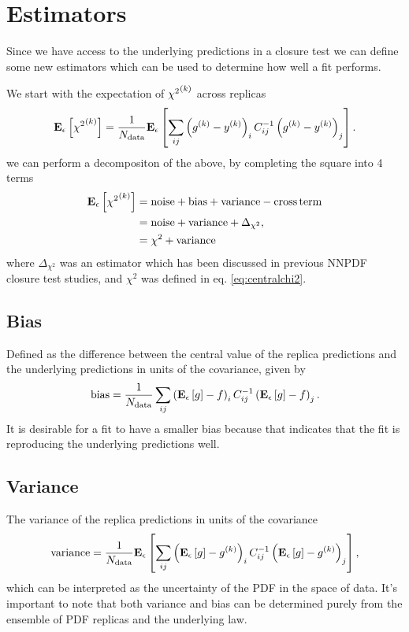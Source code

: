 \section{Estimators}
Since we have access to the underlying predictions in a closure test we can
define some new estimators which can be used to determine how well a fit performs.

We start with the expectation of ${\chi^2}^{(k)}$ across replicas
\begin{equation}
    \mathbf{E}_{\epsilon}\left[ {\chi^2}^{(k)} \right] = \frac{1}{N_{\rm data}}\mathbf{E}_{\epsilon}\left[  \sum_{ij} \left( g^{(k)} - y^{(k)} \right)_i C^{-1}_{ij} \left( g^{(k)} - y^{(k)} \right)_j \right].
\end{equation}
we can perform a decompositon of the above, by completing the square into
4 terms
\begin{equation}
    \begin{split}
        \mathbf{E}_{\epsilon}\left[ {\chi^2}^{(k)} \right] &= {\rm noise} + {\rm bias} + {\rm variance} - {\rm cross\,term} \\
        &=  {\rm noise} + {\rm variance} + \Delta_{\chi^2}, \\
        &= \chi^2 + {\rm variance}
    \end{split}
\end{equation}
where $\Delta_{\chi^2}$ was an estimator which has been discussed in previous
NNPDF closure test studies, and $\chi^2$ was defined in eq. \eqref{eq:centralchi2}.

\subsection{Bias}

Defined as the difference between the central value of the replica predictions
and the underlying predictions in units of the covariance, given by
\begin{equation}
    {\rm bias} = \frac{1}{N_{\rm data}} \sum_{ij} \left( \mathbf{E}_{\epsilon}\left[ g \right] - f \right)_i C^{-1}_{ij} \left( \mathbf{E}_{\epsilon}\left[ g \right] - f \right)_j.
\end{equation}
It is desirable for a fit to have a smaller bias because that indicates
that the fit is reproducing the underlying predictions well.

\subsection{Variance}

The variance of the replica predictions in units of the covariance
\begin{equation}
    {\rm variance} = \frac{1}{N_{\rm data}} \mathbf{E}_{\epsilon}\left[  \sum_{ij} \left( \mathbf{E}_{\epsilon}\left[ g \right] - g^{(k)}\right)_{i} C^{-1}_{ij} \left( \mathbf{E}_{\epsilon}\left[ g \right] - g^{(k)}\right)_{j} \right],
\end{equation}
which can be interpreted as the uncertainty of the PDF in the space of data. It's
important to note that both variance and bias can be determined purely from the
ensemble of PDF replicas and the underlying law.

